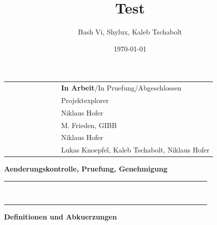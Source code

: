 \documentclass[10pt,paper=a4,final]{scrartcl}
\title{Test}
\author{Bash Vi, Shylux, Kaleb Tschabolt}
\date{\today}
\begin{document}
\maketitle
\newpage
\begin{tabularx}{\textwidth}{ r X }	%
\textcolor{white}{{\bf Status}}\cellcolor{blue!80!} & {\bf In Arbeit}/In Pruefung/Abgeschlossen\cellcolor{blue!20!} \\
\textcolor{white}{{\bf Projektname}}\cellcolor{blue!80!} & Projektexplorer\cellcolor{blue!20!} \\
\textcolor{white}{{\bf Projektleiter}}\cellcolor{blue!80!} & Niklaus Hofer\cellcolor{blue!20!} \\
\textcolor{white}{{\bf Auftraggeber}}\cellcolor{blue!80!} & M. Frieden, GIBB\cellcolor{blue!20!} \\
\textcolor{white}{{\bf Autoren}}\cellcolor{blue!80!} & Niklaus Hofer\cellcolor{blue!20!} \\
\textcolor{white}{{\bf Verteiler}}\cellcolor{blue!80!} & Lukas Knoepfel, Kaleb Tschabolt, Niklaus Hofer\cellcolor{blue!20!}
\end{tabularx}
\newline
\newline
\newline
{\bf Aenderungskontrolle, Pruefung, Genehmigung}
\newline

\begin{tabularx}{\textwidth}{l l X X}
\textcolor{white}{Version}\cellcolor{blue!80!} & \textcolor{white}{Datum}\cellcolor{blue!80!} & \textcolor{white}{Beschreibung, Bemerkung}\cellcolor{blue!80!} & \textcolor{white}{Name oder Rolle}\cellcolor{blue!80!} \\
\cellcolor{blue!20!} & \cellcolor{blue!20!} & \cellcolor{blue!20!} & \cellcolor{blue!20!} \\
\cellcolor{blue!20!} & \cellcolor{blue!20!} & \cellcolor{blue!20!} & \cellcolor{blue!20!} \\
\cellcolor{blue!20!} & \cellcolor{blue!20!} & \cellcolor{blue!20!} & \cellcolor{blue!20!} \\
\cellcolor{blue!20!} & \cellcolor{blue!20!} & \cellcolor{blue!20!} & \cellcolor{blue!20!} \\
\end{tabularx}
\newline
\newline
\newline
{\bf Definitionen und Abkuerzungen}
\newline
\end{document}
